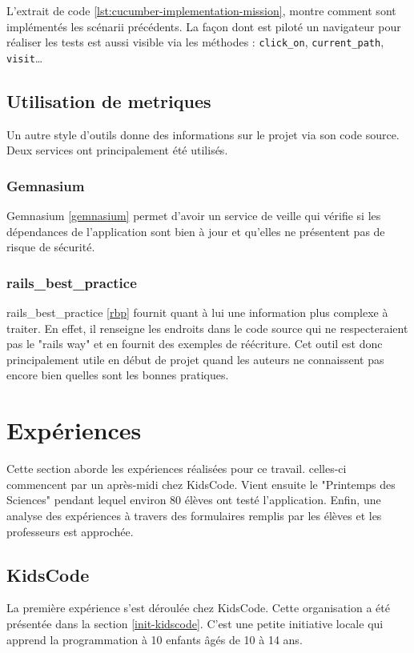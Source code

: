 L'extrait de code \ref{lst:cucumber-implementation-mission}, montre comment sont implémentés les scénarii précédents. La façon dont est piloté un navigateur pour réaliser les tests est aussi visible via les méthodes : \texttt{click\_on}, \texttt{current\_path}, \texttt{visit}\ldots

\subsection{Utilisation de metriques}
Un autre style d'outils donne des informations sur le projet via son code source. Deux services ont principalement été utilisés.

\subsubsection{Gemnasium}
Gemnasium \ref{gemnasium} permet d'avoir un service de veille qui vérifie si les dépendances de l'application sont bien à jour et qu'elles ne présentent pas de risque de sécurité.

\subsubsection{rails\_best\_practice}
rails\_best\_practice \ref{rbp} fournit quant à lui une information plus complexe à traiter. En effet, il renseigne les endroits dans le code source qui ne respecteraient pas le "rails way" et en fournit des exemples de réécriture. Cet outil est donc principalement utile en début de projet quand les auteurs ne connaissent pas encore bien quelles sont les bonnes pratiques.

\section{Expériences}
Cette section aborde les expériences réalisées pour ce travail. celles-ci commencent par un après-midi chez KidsCode. Vient ensuite le "Printemps des Sciences" pendant lequel environ 80 élèves ont testé l'application. Enfin, une analyse des expériences à travers des formulaires remplis par les élèves et les professeurs est approchée.

\subsection{KidsCode}
\label{kidscode}
La première expérience s'est déroulée chez KidsCode. Cette organisation a été présentée dans la section \ref{init-kidscode}. C'est une petite initiative locale qui apprend la programmation à 10 enfants âgés de 10 à 14 ans.

